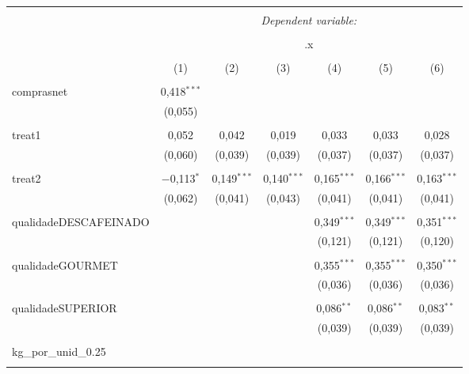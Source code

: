 
\begin{table}[!htbp] \centering 
  \caption{} 
  \label{} 
\begin{tabular}{@{\extracolsep{5pt}}lcccccc} 
\\[-1.8ex]\hline 
\hline \\[-1.8ex] 
 & \multicolumn{6}{c}{\textit{Dependent variable:}} \\ 
\cline{2-7} 
\\[-1.8ex] & \multicolumn{6}{c}{.x} \\ 
\\[-1.8ex] & (1) & (2) & (3) & (4) & (5) & (6)\\ 
\hline \\[-1.8ex] 
 comprasnet & 0,418$^{***}$ &  &  &  &  &  \\ 
  & (0,055) &  &  &  &  &  \\ 
  & & & & & & \\ 
 treat1 & 0,052 & 0,042 & 0,019 & 0,033 & 0,033 & 0,028 \\ 
  & (0,060) & (0,039) & (0,039) & (0,037) & (0,037) & (0,037) \\ 
  & & & & & & \\ 
 treat2 & $-$0,113$^{*}$ & 0,149$^{***}$ & 0,140$^{***}$ & 0,165$^{***}$ & 0,166$^{***}$ & 0,163$^{***}$ \\ 
  & (0,062) & (0,041) & (0,043) & (0,041) & (0,041) & (0,041) \\ 
  & & & & & & \\ 
 qualidadeDESCAFEINADO &  &  &  & 0,349$^{***}$ & 0,349$^{***}$ & 0,351$^{***}$ \\ 
  &  &  &  & (0,121) & (0,121) & (0,120) \\ 
  & & & & & & \\ 
 qualidadeGOURMET &  &  &  & 0,355$^{***}$ & 0,355$^{***}$ & 0,350$^{***}$ \\ 
  &  &  &  & (0,036) & (0,036) & (0,036) \\ 
  & & & & & & \\ 
 qualidadeSUPERIOR &  &  &  & 0,086$^{**}$ & 0,086$^{**}$ & 0,083$^{**}$ \\ 
  &  &  &  & (0,039) & (0,039) & (0,039) \\ 
  & & & & & & \\ 
 kg\_por\_unid\_0.25 &  &  &  &  &  &  \\ 
  &  &  &  &  &  &  \\ 

\end{tabular}
\end{table}

